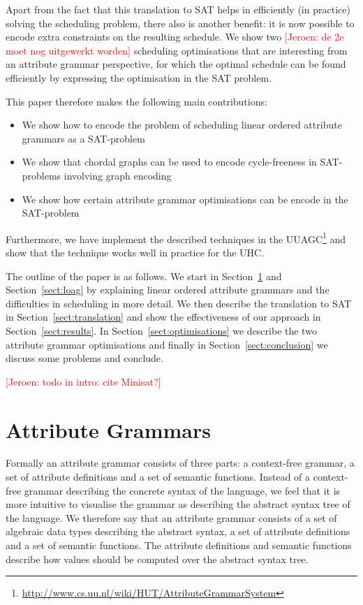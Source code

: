 \documentclass{llncs}
\newif\iffinal\finalfalse
\newcommand{\REM}[3]{\iffinal\else\textcolor{#2}{[#1: #3]}\fi}
\newcommand{\Jeroen}[1]{\REM{Jeroen}{red}{#1}}
\newcommand{\sectref}[1]{Section~\ref{#1}}
\begin{document}
Apart from the fact that this translation to SAT helps in efficiently (in practice) solving the scheduling problem, there also is another benefit: it is now possible to encode extra constraints on the resulting schedule. We show two \Jeroen{de 2e moet nog uitgewerkt worden} scheduling optimisations that are interesting from an attribute grammar perspective, for which the optimal schedule can be found efficiently by expressing the optimisation in the SAT problem.

This paper therefore makes the following main contributions:
\begin{itemize}
\item We show how to encode the problem of scheduling linear ordered attribute grammars as a SAT-problem
\item We show that chordal graphs can be used to encode cycle-freeness in SAT-problems involving graph encoding
\item We show how certain attribute grammar optimisations can be encode in the SAT-problem
\end{itemize}
Furthermore, we have implement the described techniques in the UUAGC\footnote{\url{http://www.cs.uu.nl/wiki/HUT/AttributeGrammarSystem}} \cite{combinator-languages} and show that the technique works well in practice for the UHC.

The outline of the paper is as follows. We start in \sectref{sect:ag} and \sectref{sect:loag} by explaining linear ordered attribute grammars and the difficulties in scheduling in more detail. We then describe the translation to SAT in \sectref{sect:translation} and show the effectiveness of our approach in \sectref{sect:results}. In \sectref{sect:optimisations} we describe the two attribute grammar optimisations and finally in \sectref{sect:conclusion} we discuss some problems and conclude.

\Jeroen{todo in intro: cite Minisat?}


\section{Attribute Grammars} \label{sect:ag}
Formally an attribute grammar consists of three parts: a context-free grammar, a set of attribute definitions and a set of semantic functions. Instead of a context-free grammar describing the concrete syntax of the language, we feel that it is more intuitive to visualise the grammar as describing the abstract syntax tree of the language. We therefore say that an attribute grammar consists of a set of algebraic data types describing the abstract syntax, a set of attribute definitions and a set of semantic functions. The attribute definitions and semantic functions describe how values should be computed over the abstract syntax tree.
\end{document}
